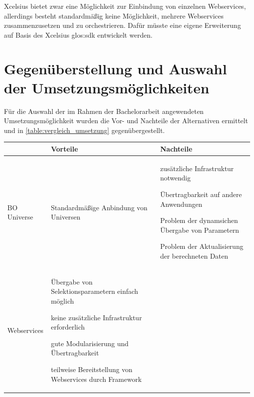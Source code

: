 \begin{onehalfspacing}
Xcelsius bietet zwar eine Möglichkeit zur Einbindung von einzelnen Webservices, allerdings besteht standardmäßig keine Möglichkeit, mehrere Webservices zusammenzusetzen und zu orchestrieren. Dafür müsste eine eigene Erweiterung auf Basis des Xcelsius \gls{glos:sdk} entwickelt werden.

\section{Gegenüberstellung und Auswahl der Umsetzungsmöglichkeiten}

Für die Auswahl der im Rahmen der Bachelorarbeit angewendeten Umsetzungsmöglichkeit wurden die Vor- und Nachteile der Alternativen ermittelt und in \vref{table:vergleich_umsetzung} gegenübergestellt.

{
\setlength{\extrarowheight}{2pt}
\begin{table}[htbp]
\centering
\begin{tabular}{| l | >{\centering\arraybackslash} m{5cm} | >{\centering\arraybackslash} m{5cm} |}
\cline{2-3}
\multicolumn{1}{l|}{}	& Vorteile & Nachteile \\	\hline
BO Universe 				&


\begin{seList}
\item Standardmäßige Anbindung von Universen
\end{seList}

&


\begin{seList}
\item zusätzliche Infrastruktur notwendig
\item Übertragbarkeit auf andere Anwendungen
\item Problem der dynamsichen Übergabe von Parametern
\item Problem der Aktualisierung der berechneten Daten
\end{seList}


\\	\hline
Webservices 			& 

\begin{seList}
\item Übergabe von Selektionsparametern einfach möglich
\item keine zusätzliche Infrastruktur erforderlich
\item gute Modularisierung und Übertragbarkeit
\item teilweise Bereitstellung von Webservices durch Framework
\end{seList}


\end{tabular}
\end{table}}
\end{onehalfspacing}
